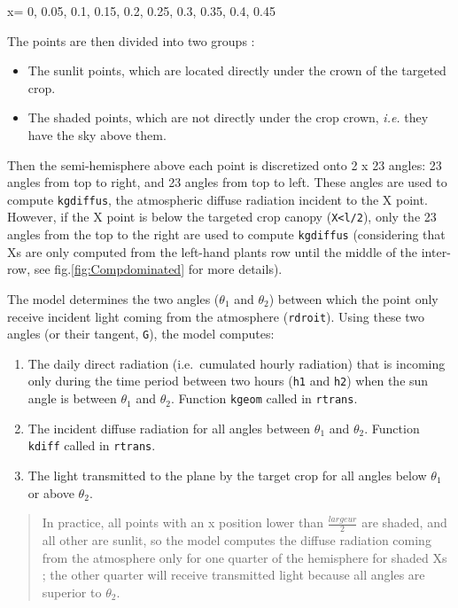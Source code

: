 \documentclass[]{book}
\providecommand{\tightlist}{%
  \setlength{\itemsep}{0pt}\setlength{\parskip}{0pt}}
\theoremstyle{definition}
\theoremstyle{definition}
\theoremstyle{definition}
\theoremstyle{remark}
\begin{document}
x= 0, 0.05, 0.1, 0.15, 0.2, 0.25, 0.3, 0.35, 0.4, 0.45

The points are then divided into two groups :

\begin{itemize}
\tightlist
\item
  The sunlit points, which are located directly under the crown of the
  targeted crop.
\item
  The shaded points, which are not directly under the crop crown,
  \emph{i.e.} they have the sky above them.
\end{itemize}

Then the semi-hemisphere above each point is discretized onto 2 x 23
angles: 23 angles from top to right, and 23 angles from top to left.
These angles are used to compute \texttt{kgdiffus}, the atmospheric
diffuse radiation incident to the X point. However, if the X point is
below the targeted crop canopy (\texttt{X\textless{}l/2}), only the 23
angles from the top to the right are used to compute \texttt{kgdiffus}
(considering that Xs are only computed from the left-hand plants row
until the middle of the inter-row, see fig.\ref{fig:Compdominated} for
more details).

The model determines the two angles (\(\theta_1\) and \(\theta_2\))
between which the point only receive incident light coming from the
atmosphere (\texttt{rdroit}). Using these two angles (or their tangent,
\texttt{G}), the model computes:

\begin{enumerate}
\def\labelenumi{\arabic{enumi}.}
\tightlist
\item
  The daily direct radiation (i.e.~cumulated hourly radiation) that is
  incoming only during the time period between two hours (\texttt{h1}
  and \texttt{h2}) when the sun angle is between \(\theta_1\) and
  \(\theta_2\). Function \texttt{kgeom} called in \texttt{rtrans}.
\item
  The incident diffuse radiation for all angles between \(\theta_1\) and
  \(\theta_2\). Function \texttt{kdiff} called in \texttt{rtrans}.
\item
  The light transmitted to the plane by the target crop for all angles
  below \(\theta_1\) or above \(\theta_2\).
\end{enumerate}

\begin{quote}
In practice, all points with an x position lower than
\(\frac{largeur}{2}\) are shaded, and all other are sunlit, so the model
computes the diffuse radiation coming from the atmosphere only for one
quarter of the hemisphere for shaded Xs ; the other quarter will receive
transmitted light because all angles are superior to \(\theta_2\).
\end{quote}
\end{document}
